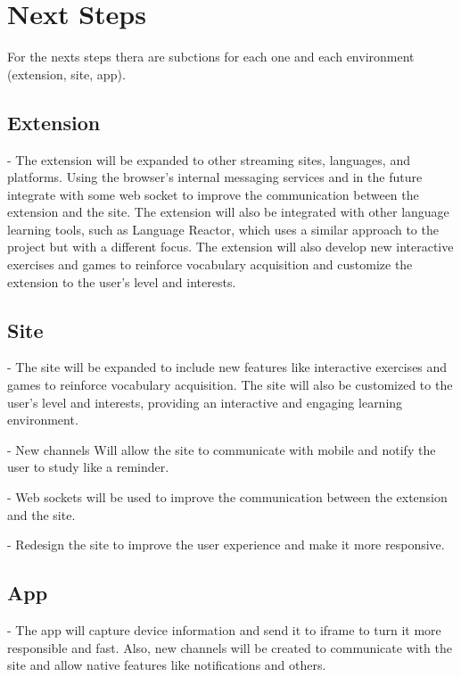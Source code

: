 \documentclass[12pt]{article}
\begin{document}
\section{Next Steps}

For the nexts steps thera are subctions for each one and each environment (extension, site, app).

\subsection{Extension}

- The extension will be expanded to other streaming sites, languages, and platforms. Using the browser's internal messaging services and in the future integrate with some web socket to improve the communication between the extension and the site. The extension will also be integrated with other language learning tools, such as Language Reactor, which uses a similar approach to the project but with a different focus. The extension will also develop new interactive exercises and games to reinforce vocabulary acquisition and customize the extension to the user's level and interests.

\subsection{Site}

- The site will be expanded to include new features like interactive exercises and games to reinforce vocabulary acquisition. The site will also be customized to the user's level and interests, providing an interactive and engaging learning environment. 

- New channels Will allow the site to communicate with mobile and notify the user to study like a reminder. 

- Web sockets will be used to improve the communication between the extension and the site.

- Redesign the site to improve the user experience and make it more responsive.

\subsection{App}

- The app will capture device information and send it to iframe to turn it more responsible and fast. Also, new channels will be created to communicate with the site and allow native features like notifications and others.
\end{document}
